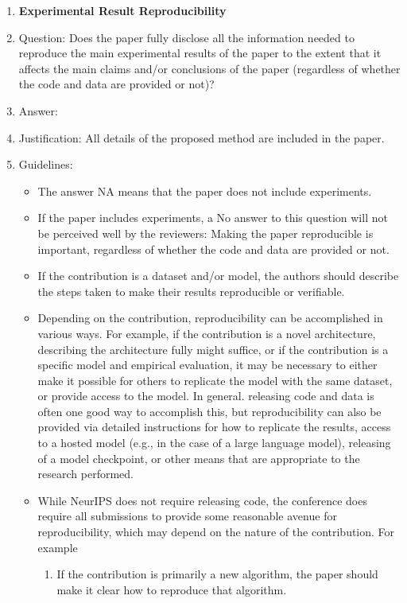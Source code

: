 \documentclass{article}
\begin{document}
\begin{enumerate}
    \item {\bf Experimental Result Reproducibility}
    \item[] Question: Does the paper fully disclose all the information needed to reproduce the main experimental results of the paper to the extent that it affects the main claims and/or conclusions of the paper (regardless of whether the code and data are provided or not)?
    \item[] Answer: \answerYes{} %
    \item[] Justification: All details of the proposed method are included in the paper.
    \item[] Guidelines:
    \begin{itemize}
        \item The answer NA means that the paper does not include experiments.
        \item If the paper includes experiments, a No answer to this question will not be perceived well by the reviewers: Making the paper reproducible is important, regardless of whether the code and data are provided or not.
        \item If the contribution is a dataset and/or model, the authors should describe the steps taken to make their results reproducible or verifiable. 
        \item Depending on the contribution, reproducibility can be accomplished in various ways. For example, if the contribution is a novel architecture, describing the architecture fully might suffice, or if the contribution is a specific model and empirical evaluation, it may be necessary to either make it possible for others to replicate the model with the same dataset, or provide access to the model. In general. releasing code and data is often one good way to accomplish this, but reproducibility can also be provided via detailed instructions for how to replicate the results, access to a hosted model (e.g., in the case of a large language model), releasing of a model checkpoint, or other means that are appropriate to the research performed.
        \item While NeurIPS does not require releasing code, the conference does require all submissions to provide some reasonable avenue for reproducibility, which may depend on the nature of the contribution. For example
        \begin{enumerate}
            \item If the contribution is primarily a new algorithm, the paper should make it clear how to reproduce that algorithm.

\end{enumerate}
\end{itemize}
\end{enumerate}
\end{document}
